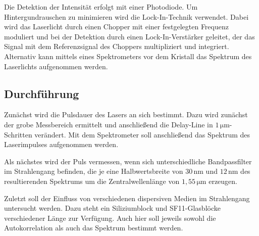 Die Detektion der Intensität erfolgt mit einer Photodiode.
Um Hintergundrauschen zu minimieren wird die Lock-In-Technik verwendet.
Dabei wird das Laserlicht durch einen Chopper mit einer festgelegten Frequenz moduliert
und bei der Detektion durch einen Lock-In-Verstärker geleitet, der das Signal mit dem Referenzsignal des Choppers multipliziert und integriert.
Alternativ kann mittels eines Spektrometers vor dem Kristall das Spektrum des Laserlichts aufgenommen werden.

\subsection{Durchführung}
\label{sec:Durchfuehrung}

Zunächst wird die Pulsdauer des Lasers an sich bestimmt. Dazu wird 
zunächst der grobe Messbereich ermittelt und anschließend die Delay-Line in $1\,\si{\micro\meter}$-Schritten verändert.
Mit dem Spektrometer soll anschließend das Spektrum des Laserimpulses aufgenommen werden.

Als nächstes wird der Puls vermessen, wenn sich unterschiedliche Bandpassfilter im Strahlengang befinden,
die je eine Halbwertsbreite von $30\,\si{\nano\meter}$ und $12\,\si{\nano\meter}$ des resultierenden Spektrums um die Zentralwellenlänge von $1,55\,\si{\micro\meter}$
erzeugen.

Zuletzt soll der Einfluss von verschiedenen dispersiven Medien im Strahlengang untersucht werden.
Dazu steht ein Siliziumblock und SF11-Glasblöcke verschiedener Länge zur Verfügung.
Auch hier soll jeweils sowohl die Autokorrelation als auch das Spektrum bestimmt werden.